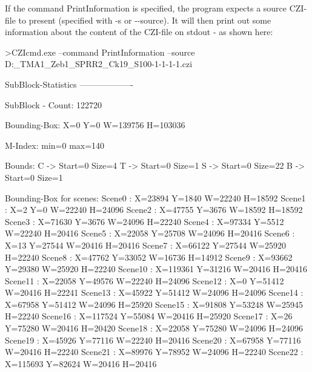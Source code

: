 If the command \textquotesingle{}Print\+Information\textquotesingle{} is specified, the program expects a source C\+Z\+I-\/file to present (specified with \textquotesingle{}-\/s\textquotesingle{} or \textquotesingle{}-\/-\/source\textquotesingle{}). It will then print out some information about the content of the C\+Z\+I-\/file on stdout -\/ as shown here\+: \begin{DoxyVerb}>CZIcmd.exe --command PrintInformation --source D:\PICTURES\Example_TMA1_Zeb1_SPRR2_Ck19_S100-1-1-1-1.czi

SubBlock-Statistics
-------------------

SubBlock - Count: 122720

Bounding-Box:
 X=0 Y=0 W=139756 H=103036

M-Index: min=0 max=140

Bounds:
 C -> Start=0 Size=4
 T -> Start=0 Size=1
 S -> Start=0 Size=22
 B -> Start=0 Size=1

Bounding-Box for scenes:
 Scene0 : X=23894 Y=1840 W=22240 H=18592
 Scene1 : X=2 Y=0 W=22240 H=24096
 Scene2 : X=47755 Y=3676 W=18592 H=18592
 Scene3 : X=71630 Y=3676 W=24096 H=22240
 Scene4 : X=97334 Y=5512 W=22240 H=20416
 Scene5 : X=22058 Y=25708 W=24096 H=20416
 Scene6 : X=13 Y=27544 W=20416 H=20416
 Scene7 : X=66122 Y=27544 W=25920 H=22240
 Scene8 : X=47762 Y=33052 W=16736 H=14912
 Scene9 : X=93662 Y=29380 W=25920 H=22240
 Scene10 : X=119361 Y=31216 W=20416 H=20416
 Scene11 : X=22058 Y=49576 W=22240 H=24096
 Scene12 : X=0 Y=51412 W=20416 H=22241
 Scene13 : X=45922 Y=51412 W=24096 H=24096
 Scene14 : X=67958 Y=51412 W=24096 H=25920
 Scene15 : X=91808 Y=53248 W=25945 H=22240
 Scene16 : X=117524 Y=55084 W=20416 H=25920
 Scene17 : X=26 Y=75280 W=20416 H=20420
 Scene18 : X=22058 Y=75280 W=24096 H=24096
 Scene19 : X=45926 Y=77116 W=22240 H=20416
 Scene20 : X=67958 Y=77116 W=20416 H=22240
 Scene21 : X=89976 Y=78952 W=24096 H=22240
 Scene22 : X=115693 Y=82624 W=20416 H=20416
\end{DoxyVerb}


